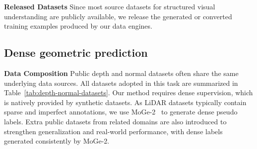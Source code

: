\textbf{Released Datasets}
Since most source datasets for structured visual understanding are publicly available, we release the generated or converted training examples produced by our data engines.

\subsection{Dense geometric prediction}
\textbf{Data Composition}
Public depth and normal datasets often share the same underlying data sources.
All datasets adopted in this task are summarized in Table~\ref{tab:depth-normal-datasets}.
Our method requires dense supervision, which is natively provided by synthetic datasets.
As LiDAR datasets typically contain sparse and imperfect annotations, we use MoGe-2~\cite{wang2025moge2} to generate dense pseudo labels.
Extra public datasets from related domains are also introduced to strengthen generalization and real-world performance, with dense labels generated consistently by MoGe-2.

